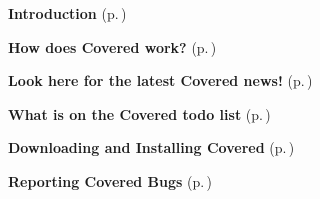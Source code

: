\begin{CompactItemize}
\item 
{\bf Introduction} {\rm (p.\,\pageref{page_intro})}\item 
{\bf How does Covered work?} {\rm (p.\,\pageref{page_howitworks})}\item 
{\bf Look here for the latest Covered news!} {\rm (p.\,\pageref{page_news})}\item 
{\bf What is on the Covered todo list} {\rm (p.\,\pageref{page_todo})}\item 
{\bf Downloading and Installing Covered} {\rm (p.\,\pageref{page_download})}\item 
{\bf Reporting Covered Bugs} {\rm (p.\,\pageref{page_bugs})}\end{CompactItemize}
